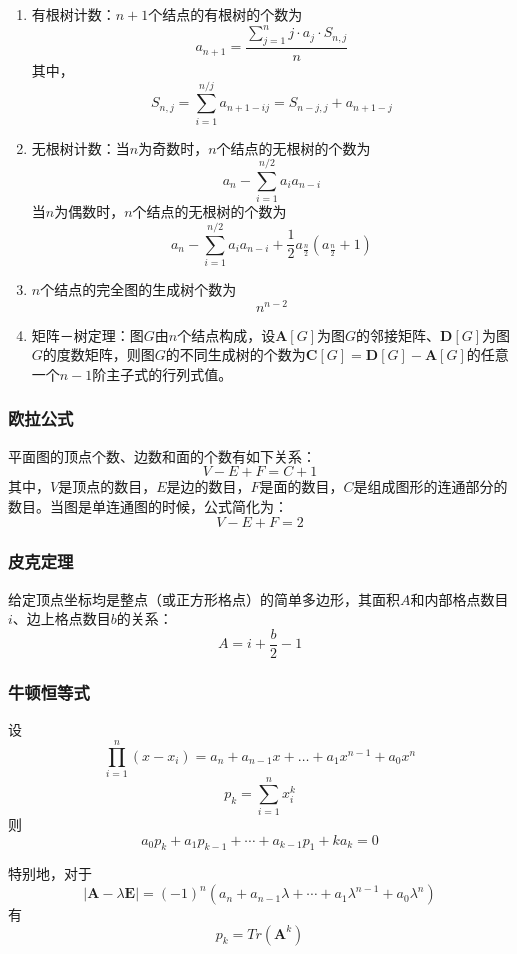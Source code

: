 \documentclass[a4paper]{article}
\begin{document}
\begin{enumerate}
	\item 有根树计数：$n+1$个结点的有根树的个数为
	$$a_{n+1} = \frac{\sum_{j=1}^{n}{j \cdot a_j \cdot{S_{n, j}}}}{n}$$
	其中，
	$$S_{n, j} = \sum_{i=1}^{n/j}{a_{n+1-ij}} = S_{n-j, j} + a_{n+1-j}$$
	\item 无根树计数：当$n$为奇数时，$n$个结点的无根树的个数为
	$$a_n-\sum_{i=1}^{n/2}{a_ia_{n-i}}$$
	当$n$为偶数时，$n$个结点的无根树的个数为
	$$a_n-\sum_{i=1}^{n/2}{a_ia_{n-i}}+\frac{1}{2}a_{\frac{n}{2}}(a_{\frac{n}{2}}+1)$$
	\item $n$个结点的完全图的生成树个数为
	$$n^{n-2}$$
	\item 矩阵－树定理：图$G$由$n$个结点构成，设$\bm{A}[G]$为图$G$的邻接矩阵、$\bm{D}[G]$为图$G$的度数矩阵，则图$G$的不同生成树的个数为$\bm{C}[G] = \bm{D}[G] - \bm{A}[G]$的任意一个$n-1$阶主子式的行列式值。
\end{enumerate}

\subsubsection{欧拉公式}

平面图的顶点个数、边数和面的个数有如下关系：
$$V - E + F = C+ 1$$
\indent 其中，$V$是顶点的数目，$E$是边的数目，$F$是面的数目，$C$是组成图形的连通部分的数目。当图是单连通图的时候，公式简化为：
$$V - E + F = 2$$

\subsubsection{皮克定理}

给定顶点坐标均是整点（或正方形格点）的简单多边形，其面积$A$和内部格点数目$i$、边上格点数目$b$的关系：
$$A = i + \frac{b}{2} - 1$$

\subsubsection{牛顿恒等式}

设$$\prod_{i = 1}^n{(x - x_i)} = a_n + a_{n - 1} x + \dots + a_1 x^{n - 1} + a_0 x^n$$
$$p_k = \sum_{i = 1}^n{x_i^k}$$
则$$a_0 p_k + a_1 p_{k - 1} + \cdots + a_{k - 1} p_1 + k a_k = 0$$

特别地，对于$$|\bm{A} - \lambda \bm{E}| = (-1)^n(a_n + a_{n - 1} \lambda + \cdots + a_1 \lambda^{n - 1} + a_0 \lambda^n)$$
有$$p_k = Tr(\bm{A}^k)$$

\end{document}
